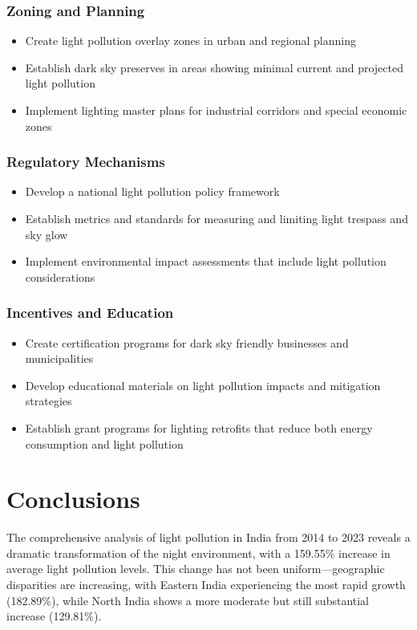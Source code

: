\documentclass[12pt,a4paper]{article}
\begin{document}
\subsubsection{Zoning and Planning}
\begin{itemize}
    \item Create light pollution overlay zones in urban and regional planning
    \item Establish dark sky preserves in areas showing minimal current and projected light pollution
    \item Implement lighting master plans for industrial corridors and special economic zones
\end{itemize}

\subsubsection{Regulatory Mechanisms}
\begin{itemize}
    \item Develop a national light pollution policy framework
    \item Establish metrics and standards for measuring and limiting light trespass and sky glow
    \item Implement environmental impact assessments that include light pollution considerations
\end{itemize}

\subsubsection{Incentives and Education}
\begin{itemize}
    \item Create certification programs for dark sky friendly businesses and municipalities
    \item Develop educational materials on light pollution impacts and mitigation strategies
    \item Establish grant programs for lighting retrofits that reduce both energy consumption and light pollution
\end{itemize}

\section{Conclusions}

The comprehensive analysis of light pollution in India from 2014 to 2023 reveals a dramatic transformation of the night environment, with a 159.55\% increase in average light pollution levels. This change has not been uniform—geographic disparities are increasing, with Eastern India experiencing the most rapid growth (182.89\%), while North India shows a more moderate but still substantial increase (129.81\%).
\end{document}
